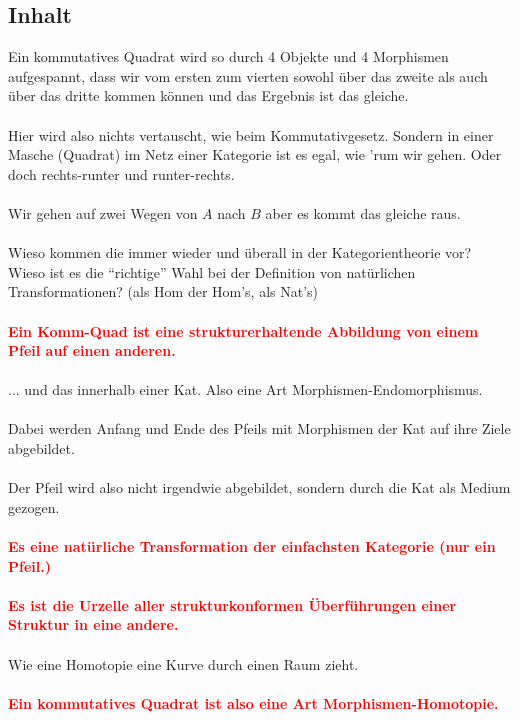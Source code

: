\documentclass[a4paper]{amsart}
\theoremstyle{definition}
\newcommand{\imporant}[1]{ \textcolor{red}{\textbf{#1}} }
\begin{document}
\subsection*{Inhalt}
Ein kommutatives Quadrat wird so durch 4 Objekte und 4 Morphismen aufgespannt, dass wir vom ersten zum vierten sowohl über das zweite als auch über das dritte kommen können und das Ergebnis ist das gleiche.
\\\\
Hier wird also nichts vertauscht, wie beim Kommutativgesetz. Sondern in einer Masche (Quadrat) im Netz einer Kategorie ist es egal, wie 'rum wir gehen. Oder doch rechts-runter und runter-rechts.
\\\\
Wir gehen auf zwei Wegen von $A$ nach $B$ aber es kommt das gleiche raus.
\\\\
Wieso kommen die immer wieder und überall in der Kategorientheorie vor? Wieso ist es die "`richtige"' Wahl bei der Definition von natürlichen Transformationen? (als Hom der Hom's, als Nat's)
\\\\
\imporant{Ein Komm-Quad ist eine strukturerhaltende Abbildung von einem Pfeil auf einen anderen.}
\\\\
... und das innerhalb einer Kat. Also eine Art Morphismen-Endomorphismus.
\\\\
Dabei werden Anfang und Ende des Pfeils mit Morphismen der Kat auf ihre Ziele abgebildet.
\\\\
Der Pfeil wird also nicht irgendwie abgebildet, sondern durch die Kat als Medium gezogen.
\\\\
\imporant{Es eine natürliche Transformation der einfachsten Kategorie (nur ein Pfeil.) }
\\\\
\imporant{Es ist die Urzelle aller strukturkonformen Überführungen einer Struktur in eine andere.}
\\\\
Wie eine Homotopie eine Kurve durch einen Raum zieht.
\\\\
\imporant{Ein kommutatives Quadrat ist also eine Art Morphismen-Homotopie.}
\\\\
\end{document}
